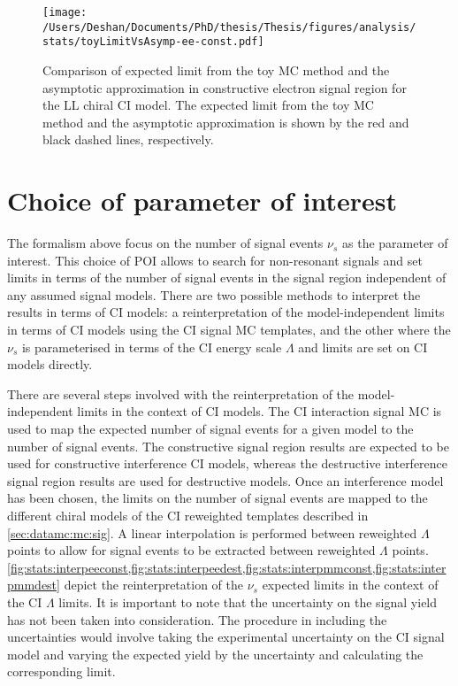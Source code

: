 \begin{figure}[!htpb]
    \centering
    \texttt{[image: /Users/Deshan/Documents/PhD/thesis/Thesis/figures/analysis/stats/toyLimitVsAsymp-ee-const.pdf]}
    \label{fig:asympVstoy1}
    \caption[Comparison of expected limit from the toy MC method and the asymptotic approximation.]{Comparison of expected limit from the toy MC method and the asymptotic approximation in constructive electron signal region for the LL chiral CI model. The expected limit from the toy MC method and the asymptotic approximation is shown by the red and black dashed lines, respectively.}
    \label{fig:asympVstoy}
\end{figure}

\section{Choice of parameter of interest}\label{sec:stat:poi}
The formalism above focus on the number of signal events $\nu_s$ as the parameter of interest. This choice of POI allows to search for non-resonant signals and set limits in terms of the number of signal events in the signal region independent of any assumed signal models. There are two possible methods to interpret the results in terms of CI models: a reinterpretation of the model-independent limits in terms of CI models using the CI signal MC templates, and the other where the $\nu_s$ is parameterised in terms of the CI energy scale $\Lambda$ and limits are set on CI models directly.  

There are several steps involved with the reinterpretation of the model-independent limits in the context of CI models. The CI interaction signal MC is used to map the expected number of signal events for a given model to the number of signal events. The constructive signal region results are expected to be used for constructive interference CI models, whereas the destructive interference signal region results are used for destructive models. Once an interference model has been chosen, the limits on the number of signal events are mapped to the different chiral models of the CI reweighted templates described in \cref{sec:datamc:mc:sig}. A linear interpolation is performed between reweighted $\Lambda$ points to allow for signal events to be extracted between reweighted $\Lambda$ points. \cref{fig:stats:interpeeconst,fig:stats:interpeedest,fig:stats:interpmmconst,fig:stats:interpmmdest} depict the reinterpretation of the $\nu_s$ expected limits in the context of the CI $\Lambda$ limits. It is important to note that the uncertainty on the signal yield has not been taken into consideration. The procedure in including the uncertainties would involve taking the experimental uncertainty on the CI signal model and varying the expected yield by the uncertainty and calculating the corresponding limit. 

